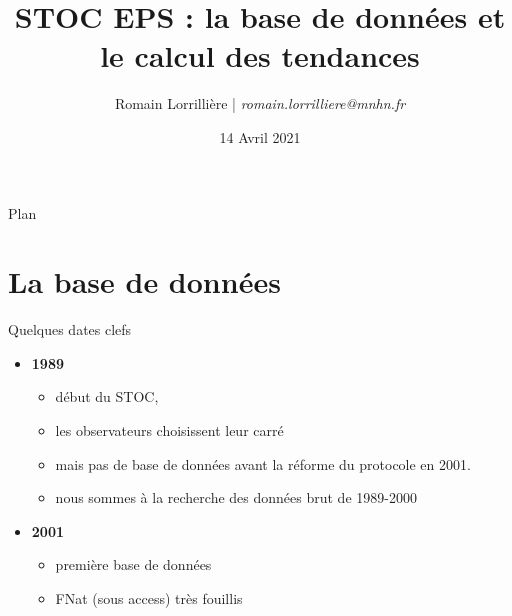 \documentclass[]{beamer}
\title[STOC: DB et tendances]{STOC EPS : la base de données et le
  calcul des tendances}
\author{Romain Lorrillière | \textit{romain.lorrilliere@mnhn.fr}}
\date{14 Avril 2021}
\begin{document}
\maketitle





\begin{frame}{Plan}
  \tableofcontents[pausesections]
\end{frame}




\section{La base de données}


\begin{frame} {Quelques dates clefs}
  \begin{itemize}[<+->]
  \item \textbf{1989}
    \begin{itemize}
    \item début du STOC,
    \item les observateurs choisissent leur carré
    \item mais pas de base de données avant la réforme du
      protocole en 2001.
    \item nous sommes à la recherche des données brut de 1989-2000
    \end{itemize}
  \item \textbf{2001}
    \begin{itemize}
    \item première base de données 
    \item FNat (sous access) très fouillis
    \end{itemize}
     \end{itemize}
\end{frame}
\end{document}
